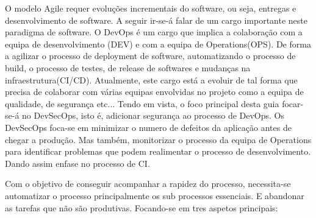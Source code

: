 	O modelo Agile requer evoluções incrementais do software, ou seja, entregas e desenvolvimento de software. A seguir ir-se-á falar de um cargo importante neste paradigma de software.
	O DevOps é um cargo que implica a colaboração com a equipa de desenvolvimento (DEV) e com a equipa de Operations(OPS). De forma a agilizar o processo de deployment de software, automatizando o processo de build, o processo de testes, de release de softwares e mudanças na infraestrutura(CI/CD). Atualmente, este cargo está a evoluir de tal forma que precisa de colaborar com várias equipas envolvidas no projeto como a equipa de qualidade, de segurança etc... 
	Tendo em vista, o foco principal desta guia focar-se-á no DevSecOps, isto é, adicionar segurança ao processo de DevOps. Os DevSecOps foca-se em minimizar o numero de defeitos da aplicação antes de chegar a produção. Mas também, monitorizar o processo da equipa de Operations para identificar problemas que podem realimentar o processo de desenvolvimento. Dando assim enfase no processo de CI.

	Com o objetivo de conseguir acompanhar a rapidez do processo, necessita-se automatizar o processo principalmente os sub processos essenciais. E abandonar as tarefas que não são produtivas. Focando-se em tres aspetos principais:

